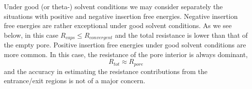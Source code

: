 \documentclass[12pt, a4paper]{article}
\begin{document}
Under good  (or theta-) solvent conditions we may consider separately the situations with positive and negative insertion free energies. 
Negative insertion free energies are rather exceptional under good solvent conditions. As we see below, in this case $R_{caps}\leq R_{convergent}$ and the total resistance
is lower than that of the empty pore.
Positive insertion free energies under good solvent conditions are more common. 
In this case, the resistance of the pore interior is always dominant, 
$$
R_{tot}\approx R_{pore}
$$
and the accuracy in estimating the resistance contributions from the entrance/exit regions is not of a major concern. 





\end{document}
